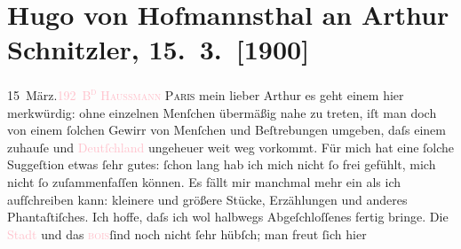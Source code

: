 

               \section[Hugo von Hofmannsthal an Arthur Schnitzler, 15. 3. {[}1900{]}]{ Hugo von Hofmannsthal an Arthur Schnitzler,
               15. 3. {[}1900{]}}\nopagebreak{}\rehead{ }\normalsize\beginnumbering{} \toendnotes[C]{\smallbreak\pagebreak[2]} 
\toendnotes[C]{\smallbreak}\pstart
           \noindent{}{\pb}15 März.\hfill \textsc{\textcolor{pink}{192 B\textsuperscript{d}
                           Haussmann}{}\ledrightnote{\textcolor{pink}{Boulevard Haussmann}}}\pend
           \pstart
           \raggedleft{}\textsc{Paris}\pend
           \pstart{}mein lieber Arthur\pend\pstart
           es geht einem hier merkwürdig: ohne einzelnen Menſchen übermäßig nahe zu treten, iſt
               man doch von einem ſolchen Gewirr von Menſchen und Beſtrebungen umgeben, daſs einem
               zuhauſe und \textcolor{pink}{Deutſchland}{}\ledrightnote{\textcolor{pink}{Deutschland}} ungeheuer weit weg vorkommt.
               Für mich hat eine ſolche Suggeſtion etwas ſehr gutes: ſchon lang hab ich mich nicht
               ſo frei gefühlt, mich {\pb}nicht ſo
               zuſammenfaſſen können. Es fällt mir manchmal mehr ein als ich aufſchreiben kann:
               kleinere und größere Stücke, Erzählungen und anderes Phantaſtiſches. Ich hoffe, daſs
               ich wol halbwegs Abgeſchloſſenes fertig bringe.\pend
           \pstart
           Die \textcolor{pink}{Stadt}{} und das \textcolor{pink}{\textsc{bois}}{}\ledrightnote{\textcolor{pink}{Bois de Boulogne}}{ }ſind noch nicht ſehr hübſch; man freut ſich hier
